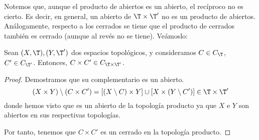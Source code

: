 Notemos que, aunque el producto de abiertos es un abierto, el recíproco no es cierto. Es decir, en general, un abierto de $\T\times \T'$ no es un producto de abiertos. Análogamente, respecto a los cerrados se tiene que el producto de cerrados también es cerrado (aunque al revés no se tiene). Veámoslo:
\begin{prop}
    Sean $(X,\T), (Y,\T')$ dos espacios topológicos, y consideramos $C\in C_\T$, $C'\in C_{\T'}$. Entonces, $C\times C'\in C_{\T\times \T'}$. 
\end{prop}
\begin{proof}
    Demostramos que su complementario es un abierto. 
    \begin{equation*}
        (X\times Y) \setminus (C\times C') = [(X\setminus C)\times Y] \cup [X\times (Y\setminus C')]\in \T\times \T'
    \end{equation*}
    donde hemos visto que es un abierto de la topología producto ya que $X$ e $Y$ son abiertos en sus respectivas topologías.

    Por tanto, tenemos que $C\times C'$ es un cerrado en la topología producto.
\end{proof}

